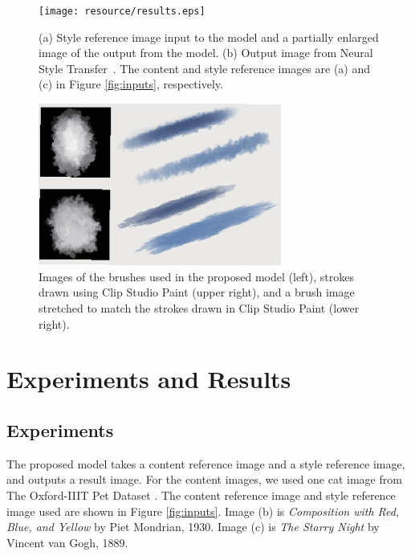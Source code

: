 \documentclass{mva_style}
\begin{document}
\begin{figure}[t]
  \centering
  \texttt{[image: resource/results.eps]}
  \caption{(a) Style reference image input to the model and a partially enlarged image of the output from the model.
           (b) Output image from Neural Style Transfer~\cite{ImageStyleTransfer}.
           The content and style reference images are (a) and (c) in Figure \ref{fig:inputs}, respectively.
         }
  \label{fig:result}
\end{figure}

\begin{figure}[t]
  \centering
  \includegraphics[width=80mm]{resource/brush_discussion.eps}
  \caption{Images of the brushes used in the proposed model (left), 
  strokes drawn using Clip Studio Paint (upper right), 
  and a brush image stretched to match the strokes drawn in Clip Studio Paint (lower right).}
  \label{fig:discussion}
\end{figure}

\section{Experiments and Results}

\subsection{Experiments}
The proposed model takes a content reference image and a style reference image, 
and outputs a result image. For the content images, we used one cat image from 
The Oxford-IIIT Pet Dataset \cite{oxford-dataset}.
The content reference image and style reference image used are shown in Figure \ref{fig:inputs}.
Image (b) is \textit{Composition with Red,
Blue, and Yellow} by Piet Mondrian, 1930. Image (c) is \textit{The Starry Night} 
by Vincent van Gogh, 1889.
\end{document}
